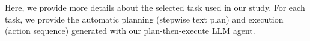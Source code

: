 Here, we provide more details about the selected task used in our study. For each task, we provide the automatic planning (\ie stepwise text plan) and execution (\ie action sequence) generated with our plan-then-execute LLM agent.



